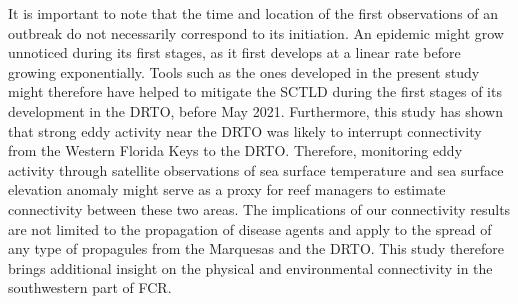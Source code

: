 It is important to note that the time and location of the first observations of an outbreak do not necessarily correspond to its initiation. An epidemic might grow unnoticed during its first stages, as it first develops at a linear rate before growing exponentially. Tools such as the ones developed in the present study might therefore have helped to mitigate the SCTLD during the first stages of its development in the DRTO, before May 2021. Furthermore, this study has shown that strong eddy activity near the DRTO was likely to interrupt connectivity from the Western Florida Keys to the DRTO. Therefore, monitoring eddy activity through satellite observations of sea surface temperature and sea surface elevation anomaly \citep{kourafalou2018physical} might serve as a proxy for reef managers to estimate connectivity between these two areas. The implications of our connectivity results are not limited to the propagation of disease agents and apply to the spread of any type of propagules from the Marquesas and the DRTO. This study therefore brings additional insight on the physical and environmental connectivity in the southwestern part of FCR.

